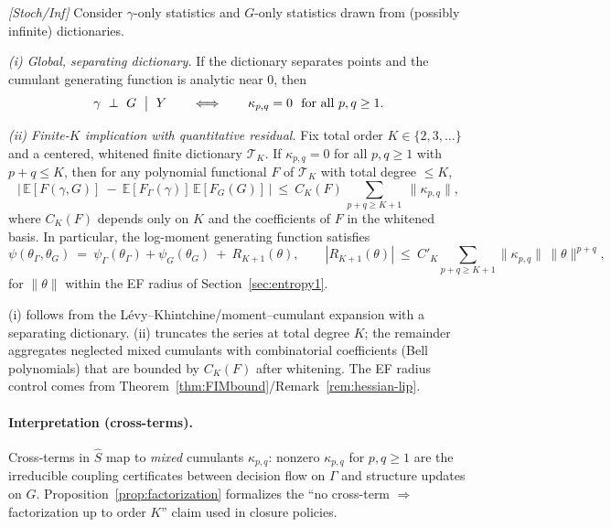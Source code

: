 \begin{proposition}\label{prop:factorization}
\emph{[\textup{Stoch/Inf}]}
Consider $\gamma$-only statistics and $G$-only statistics drawn from (possibly infinite) dictionaries.

\emph{(i) Global, separating dictionary.}
If the dictionary separates points and the cumulant generating function is analytic near $0$, then
\[
\gamma\ \perp\ G\ \bigm|\ Y \qquad \Longleftrightarrow \qquad \kappa_{p,q}=0\ \ \text{for all }p,q\ge 1.
\]

\emph{(ii) Finite-$K$ implication with quantitative residual.}
Fix total order $K\in\{2,3,\dots\}$ and a centered, whitened finite dictionary $\mathcal T_K$. If $\kappa_{p,q}=0$ for all $p,q\ge1$ with $p+q\le K$, then for any polynomial functional $F$ of $\mathcal T_K$ with total degree $\le K$,
\[
\Big|\,\mathbb E[F(\gamma,G)]\ -\ \mathbb E[F_\Gamma(\gamma)]\,\mathbb E[F_G(G)]\,\Big|
\ \le\ C_K(F)\,\sum_{p+q\ge K+1}\ \|\kappa_{p,q}\|,
\]
where $C_K(F)$ depends only on $K$ and the coefficients of $F$ in the whitened basis. In particular, the log-moment generating function satisfies
\[
\psi(\theta_\Gamma,\theta_G)\ =\ \psi_\Gamma(\theta_\Gamma)+\psi_G(\theta_G)\ +\ R_{K+1}(\theta),
\qquad |R_{K+1}(\theta)|\ \le\ C'_K\!\sum_{p+q\ge K+1}\|\kappa_{p,q}\|\,\|\theta\|^{p+q},
\]
for $\|\theta\|$ within the EF radius of Section~\ref{sec:entropy1}.
\begin{proofsketch}
(i) follows from the L\'evy--Khintchine/moment--cumulant expansion with a separating dictionary. (ii) truncates the series at total degree $K$; the remainder aggregates neglected mixed cumulants with combinatorial coefficients (Bell polynomials) that are bounded by $C_K(F)$ after whitening. The EF radius control comes from Theorem~\ref{thm:FIMbound}/Remark~\ref{rem:hessian-lip}.
\end{proofsketch}
\end{proposition}

\paragraph{Interpretation (cross-terms).}
Cross-terms in $\hat S$ map to \emph{mixed} cumulants $\kappa_{p,q}$: nonzero $\kappa_{p,q}$ for $p,q\ge1$ are the irreducible coupling certificates between decision flow on $\Gamma$ and structure updates on $G$. Proposition~\ref{prop:factorization} formalizes the ``no cross-term $\Rightarrow$ factorization up to order $K$'' claim used in closure policies.

